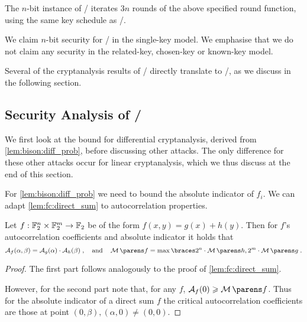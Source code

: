 The $n$-bit instance of \wisent/ iterates $3n$ rounds of the above specified round function, using the same key schedule as \bison/.

\begin{secclaim}[\wisent/]
  We claim $n$-bit security for \wisent/ in the single-key model.
  We emphasise that we do not claim any security in the related-key, chosen-key or known-key model.
\end{secclaim}

Several of the cryptanalysis results of \bison/ directly translate to \wisent/, as we discuss in the following section.

\subsection{Security Analysis of \wisent/}\label{sec:wisent:analysis}

We first look at the bound for differential cryptanalysis, derived from \cref{lem:bison:diff_prob}, before discussing other attacks.
The only difference for these other attacks occur for linear cryptanalysis, which we thus discuss at the end of this section.

For \cref{lem:bison:diff_prob} we need to bound the absolute indicator of $f_i$.
We can adapt \cref{lem:fc:direct_sum} to autocorrelation properties.
\begin{lemma}\label{lem:ac:direct_sum}
    Let $f : \mathbb{F}_2^n \times \mathbb{F}_2^m \to \mathbb{F}_2$ be of the form $f(x, y) = g(x) + h(y)$.
    Then for $f$'s autocorrelation coefficients and absolute indicator it holds that
    \begin{equation*}
        \AC{f}(\alpha, \beta) = \AC{g}(\alpha) \cdot \AC{h}(\beta)\;,
        \quad\text{and}\quad
        \absoluteindicator{f} = \max \set{2^n \cdot \absoluteindicator{h}, 2^m \cdot \absoluteindicator{g}}\;.
    \end{equation*}
\end{lemma}
\begin{proof}
    The first part follows analogously to the proof of \cref{lem:fc:direct_sum}.

    However, for the second part note that, for any $f$, $\AC{f}(0) \geqslant \absoluteindicator{f}$.
    Thus for the absolute indicator of a direct sum $f$ the critical autocorrelation coefficients are those at point $(0,\beta), (\alpha, 0) \neq (0, 0)$.
\end{proof}

